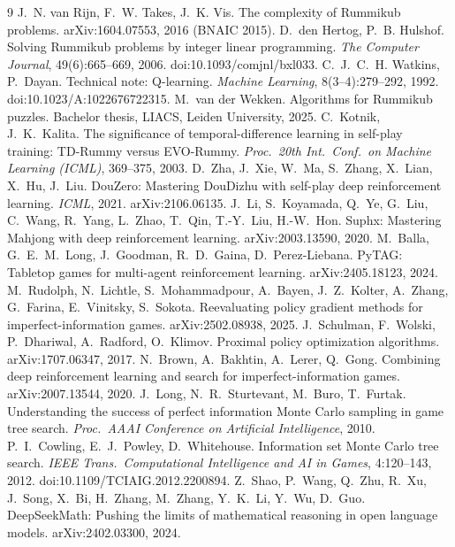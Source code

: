 \documentclass[11pt]{article}
\begin{document}
\begin{thebibliography}{9}
 J.~N. van Rijn, F.~W. Takes, J.~K. Vis. The complexity of Rummikub problems. arXiv:1604.07553, 2016 (BNAIC 2015).
 D.~den Hertog, P.~B. Hulshof. Solving Rummikub problems by integer linear programming. \emph{The Computer Journal}, 49(6):665--669, 2006. doi:10.1093/comjnl/bxl033.
 C.~J.~C.~H. Watkins, P.~Dayan. Technical note: Q-learning. \emph{Machine Learning}, 8(3--4):279--292, 1992. doi:10.1023/A:1022676722315.
 M.~van der Wekken. Algorithms for Rummikub puzzles. Bachelor thesis, LIACS, Leiden University, 2025.
 C.~Kotnik, J.~K.~Kalita. The significance of temporal-difference learning in self-play training: TD-Rummy versus EVO-Rummy. \emph{Proc.\ 20th Int.\ Conf.\ on Machine Learning (ICML)}, 369--375, 2003.
 D.~Zha, J.~Xie, W.~Ma, S.~Zhang, X.~Lian, X.~Hu, J.~Liu. DouZero: Mastering DouDizhu with self-play deep reinforcement learning. \emph{ICML}, 2021. arXiv:2106.06135.
 J.~Li, S.~Koyamada, Q.~Ye, G.~Liu, C.~Wang, R.~Yang, L.~Zhao, T.~Qin, T.-Y.~Liu, H.-W.~Hon. Suphx: Mastering Mahjong with deep reinforcement learning. arXiv:2003.13590, 2020.
 M.~Balla, G.~E.~M.~Long, J.~Goodman, R.~D.~Gaina, D.~Perez-Liebana. PyTAG: Tabletop games for multi-agent reinforcement learning. arXiv:2405.18123, 2024.
 M.~Rudolph, N.~Lichtle, S.~Mohammadpour, A.~Bayen, J.~Z.~Kolter, A.~Zhang, G.~Farina, E.~Vinitsky, S.~Sokota. Reevaluating policy gradient methods for imperfect-information games. arXiv:2502.08938, 2025.
 J.~Schulman, F.~Wolski, P.~Dhariwal, A.~Radford, O.~Klimov. Proximal policy optimization algorithms. arXiv:1707.06347, 2017.
 N.~Brown, A.~Bakhtin, A.~Lerer, Q.~Gong. Combining deep reinforcement learning and search for imperfect-information games. arXiv:2007.13544, 2020.
 J.~Long, N.~R.~Sturtevant, M.~Buro, T.~Furtak. Understanding the success of perfect information Monte Carlo sampling in game tree search. \emph{Proc.\ AAAI Conference on Artificial Intelligence}, 2010.
 P.~I.~Cowling, E.~J.~Powley, D.~Whitehouse. Information set Monte Carlo tree search. \emph{IEEE Trans.\ Computational Intelligence and AI in Games}, 4:120--143, 2012. doi:10.1109/TCIAIG.2012.2200894.
 Z.~Shao, P.~Wang, Q.~Zhu, R.~Xu, J.~Song, X.~Bi, H.~Zhang, M.~Zhang, Y.~K.~Li, Y.~Wu, D.~Guo. DeepSeekMath: Pushing the limits of mathematical reasoning in open language models. arXiv:2402.03300, 2024.

\end{thebibliography}
\end{document}
